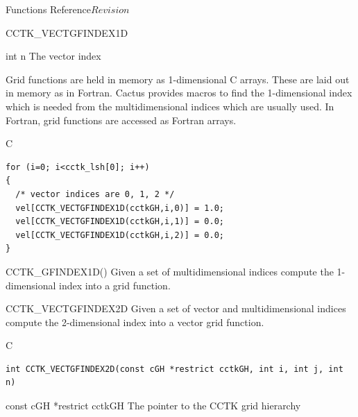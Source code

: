 \begin{cactuspart}{ Functions Reference}{}{$Revision$}
\begin{FunctionDescription}{CCTK\_VECTGFINDEX1D}
\begin{ParameterSection}
\begin{Parameter} {int n}
The vector index
\end{Parameter}
\end{ParameterSection}

\begin{Discussion}
Grid functions are held in memory as 1-dimensional C arrays. These are
laid out in memory as in Fortran. Cactus provides macros to find the
1-dimensional index which is needed from the multidimensional indices which
are usually used. In Fortran, grid functions are accessed as Fortran arrays.
\end{Discussion}
\begin{ExampleSection}
\begin{Example}{C}
\begin{verbatim}
for (i=0; i<cctk_lsh[0]; i++)
{
  /* vector indices are 0, 1, 2 */
  vel[CCTK_VECTGFINDEX1D(cctkGH,i,0)] = 1.0;
  vel[CCTK_VECTGFINDEX1D(cctkGH,i,1)] = 0.0;
  vel[CCTK_VECTGFINDEX1D(cctkGH,i,2)] = 0.0;
}
\end{verbatim}
\end{Example}
\end{ExampleSection}
\begin{SeeAlsoSection}
\begin{SeeAlso}{CCTK\_GFINDEX1D()}
Given a set of multidimensional indices compute the 1-dimensional index into a
grid function.
\end{SeeAlso}

\end{SeeAlsoSection}
\end{FunctionDescription}



\begin{FunctionDescription}{CCTK\_VECTGFINDEX2D}
\label{CCTK-VECTGFINDEX2D}
Given a set of vector and multidimensional indices compute the 2-dimensional
index into a vector grid function.
\begin{SynopsisSection}
\begin{Synopsis}{C}
\begin{verbatim}
int CCTK_VECTGFINDEX2D(const cGH *restrict cctkGH, int i, int j, int n)
\end{verbatim}
\end{Synopsis}
\end{SynopsisSection}

\begin{ParameterSection}
\begin{Parameter} {const cGH *restrict cctkGH}
The pointer to the CCTK grid hierarchy
\end{Parameter}


\end{ParameterSection}
\end{FunctionDescription}
\end{cactuspart}
